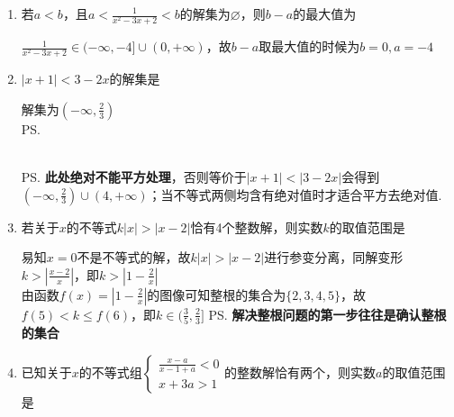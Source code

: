 \begin{enumerate}
\begin{jieda}
        绘制$y = 3(x-b)(x-a)$和$y = 3x-2a-b$的草图可知不等式的解集为$(b, x_1) \cup (a, x_2)$，其中$x_1, x_2$是方程$3(x-b)(x-a) = 3x-2a-b$的两根。根据韦达定理可知解集的区间长度和为$x_1 + x_2 - a - b = 1$ \\
        \ps 本题也可以通过绘制$y = \frac{1}{x-a} + \frac{2}{x-b}$的草图，分析其单调区间，值域来解决。本质是一样的。
    \end{jieda}
    \item 若$a < b$，且$a < \frac{1}{x^2-3x+2}<b$的解集为$\varnothing$，则$b-a$的最大值为
    \begin{jieda}
        $\frac{1}{x^2-3x+2} \in (-\infty, -4] \cup (0, +\infty)$，故$b-a$取最大值的时候为$b = 0, a = -4$
    \end{jieda}
    \item $|x+1| < 3-2x$的解集是
    \begin{jieda}
        解集为$(-\infty, \frac{2}{3})$ \\
        \ps {} \\
        \ps \textbf{此处绝对不能平方处理}，否则等价于$|x+1| < |3-2x|$会得到$(-\infty, \frac{2}{3}) \cup (4, +\infty)$；当不等式两侧均含有绝对值时才适合平方去绝对值.
    \end{jieda}
    \item 若关于$x$的不等式$k|x| > |x - 2|$恰有4个整数解，则实数$k$的取值范围是\blkda{$(\frac{3}{5}, \frac{2}{3}]$}
    \begin{jieda}
        易知$x = 0$不是不等式的解，故$k|x| > |x - 2|$进行参变分离，同解变形$k > |\frac{x-2}{x}|$，即$k > |1 - \frac{2}{x}|$ \\
        由函数$f(x) = |1 - \frac{2}{x}|$的图像可知整根的集合为$\{2, 3, 4, 5\}$，故$f(5) < k \leq f(6)$，即$k \in (\frac{3}{5}, \frac{2}{3}]$
        \ps \textbf{解决整根问题的第一步往往是确认整根的集合}
    \end{jieda}
    \item 已知关于$x$的不等式组$\left \{ \begin{array}{l}
         \frac{x-a}{x-1+a} < 0\\
         x+3a>1 
    \end{array}\right.$的整数解恰有两个，则实数$a$的取值范围是\blkda{$(1, 2]$}

\end{enumerate}
